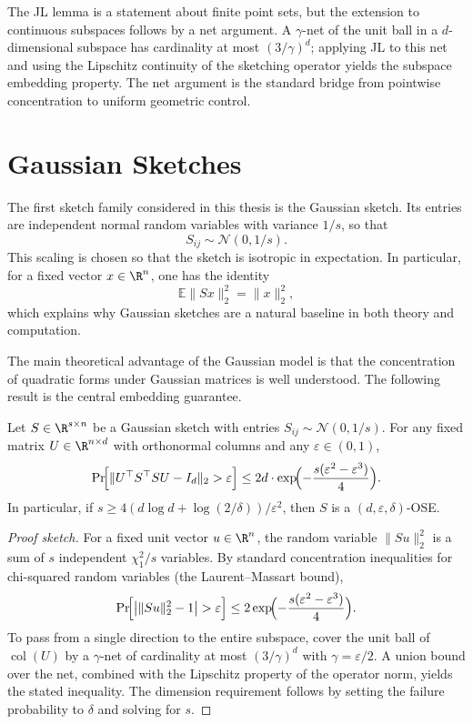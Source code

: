 The JL lemma is a statement about finite point sets, but the extension to continuous subspaces follows by a net argument. A \(\gamma\)-net of the unit ball in a \(d\)-dimensional subspace has cardinality at most \((3/\gamma)^d\); applying JL to this net and using the Lipschitz continuity of the sketching operator yields the subspace embedding property. The net argument is the standard bridge from pointwise concentration to uniform geometric control.

\section{Gaussian Sketches}

The first sketch family considered in this thesis is the Gaussian sketch. Its entries are independent normal random variables with variance \(1/s\), so that
\[
	S_{ij} \sim \mathcal{N}(0, 1/s).
\]
This scaling is chosen so that the sketch is isotropic in expectation. In particular, for a fixed vector \(x \in \R^n\), one has the identity
\[
	\mathbb{E}\|Sx\|_2^2 = \|x\|_2^2,
\]
which explains why Gaussian sketches are a natural baseline in both theory and computation.

The main theoretical advantage of the Gaussian model is that the concentration of quadratic forms under Gaussian matrices is well understood. The following result is the central embedding guarantee.

\begin{proposition} \label{prop:gaussian_ose}
	Let \(S \in \R^{s \times n}\) be a Gaussian sketch with entries \(S_{ij} \sim \mathcal{N}(0,1/s)\). For any fixed matrix \(U \in \R^{n \times d}\) with orthonormal columns and any \(\varepsilon \in (0,1)\),
	\[
		\Pr\!\Bigl[\|U^\top S^\top S U - I_d\|_2 > \varepsilon\Bigr] \le 2d \cdot \exp\!\Bigl(-\frac{s(\varepsilon^2 - \varepsilon^3)}{4}\Bigr).
	\]
	In particular, if \(s \ge 4(d\log d + \log(2/\delta))/\varepsilon^2\), then \(S\) is a \((d,\varepsilon,\delta)\)-OSE.
\end{proposition}

\begin{proof}[Proof sketch]
	For a fixed unit vector \(u \in \R^n\), the random variable \(\|Su\|_2^2\) is a sum of \(s\) independent \(\chi^2_1/s\) variables. By standard concentration inequalities for chi-squared random variables (the Laurent--Massart bound),
	\[
		\Pr\!\Bigl[\bigl|\|Su\|_2^2 - 1\bigr| > \varepsilon\Bigr] \le 2\exp\!\Bigl(-\frac{s(\varepsilon^2 - \varepsilon^3)}{4}\Bigr).
	\]
	To pass from a single direction to the entire subspace, cover the unit ball of \(\operatorname{col}(U)\) by a \(\gamma\)-net of cardinality at most \((3/\gamma)^d\) with \(\gamma = \varepsilon/2\). A union bound over the net, combined with the Lipschitz property of the operator norm, yields the stated inequality. The dimension requirement follows by setting the failure probability to \(\delta\) and solving for \(s\).
\end{proof}

